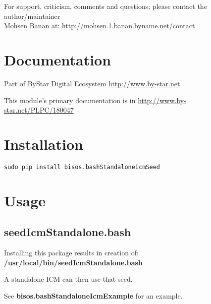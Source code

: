\documentclass{article}
\begin{document}
For support, criticism, comments and questions; please contact the 
author/maintainer \\
\href{http://mohsen.1.banan.byname.net}{Mohsen Banan} at: \url{http://mohsen.1.banan.byname.net/contact}


\section{Documentation}

Part of ByStar Digital Ecosystem \url{http://www.by-star.net}.

This module's primary documentation is in  \url{http://www.by-star.net/PLPC/180047}

\section{Installation}

\begin{verbatim}
sudo pip install bisos.bashStandaloneIcmSeed
\end{verbatim}


\section{Usage}

\subsection{seedIcmStandalone.bash}

Installing this package results in creation of:\\
\textbf{/usr/local/bin/seedIcmStandalone.bash}

A standalone ICM can then use that seed.

See \textbf{bisos.bashStandaloneIcmExample} for an example.


\begin{comment}
*  [[elisp:(org-cycle)][| ]]  *DBLK: main-end*                                       :: [[elisp:(beginning-of-buffer)][Top]] [[elisp:(delete-other-windows)][(1)]]  [[elisp:(org-cycle)][| ]]
\end{comment}
\end{document}
